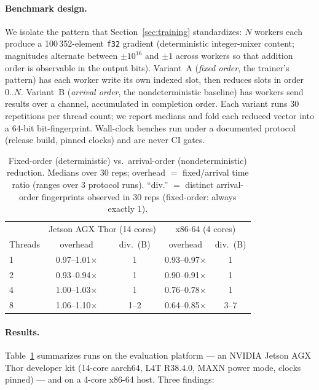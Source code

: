 \documentclass[sigconf,review]{acmart}
\begin{document}
\paragraph{Benchmark design.}
We isolate the pattern that Section~\ref{sec:training} standardizes: $N$
workers each produce a 100\,352-element \texttt{f32} gradient (deterministic
integer-mixer content; magnitudes alternate between $\pm 10^{16}$ and
$\pm 1$ across workers so that addition order is observable in the output
bits). Variant~A (\emph{fixed order}, the trainer's pattern) has each
worker write its own indexed slot, then reduces slots in order $0..N$.
Variant~B (\emph{arrival order}, the nondeterministic baseline) has workers
send results over a channel, accumulated in completion order. Each variant
runs 30 repetitions per thread count; we report medians and fold each
reduced vector into a 64-bit bit-fingerprint. Wall-clock benches run under
a documented protocol (release build, pinned clocks) and are never CI
gates.

\begin{table}
\caption{Fixed-order (deterministic) vs.\ arrival-order (nondeterministic)
reduction. Medians over 30 reps; overhead $=$ fixed/arrival time ratio
(ranges over 3 protocol runs). ``div.'' $=$ distinct arrival-order
fingerprints observed in 30 reps (fixed-order: always exactly 1).}
\label{tab:cost}
\small
\begin{tabular}{lcccc}
\toprule
& \multicolumn{2}{c}{Jetson AGX Thor (14 cores)} &
\multicolumn{2}{c}{x86-64 (4 cores)} \\
Threads & overhead & div.\ (B) & overhead & div.\ (B) \\
\midrule
1 & 0.97--1.01$\times$ & 1 & 0.93--0.97$\times$ & 1 \\
2 & 0.93--0.94$\times$ & 1 & 0.90--0.91$\times$ & 1 \\
4 & 1.00--1.03$\times$ & 1 & 0.76--0.78$\times$ & 1 \\
8 & 1.06--1.10$\times$ & 1--2 & 0.64--0.85$\times$ & 3--7 \\
\bottomrule
\end{tabular}
\end{table}

\paragraph{Results.}
Table~\ref{tab:cost} summarizes runs on the evaluation platform --- an
NVIDIA Jetson AGX Thor developer kit (14-core aarch64, L4T R38.4.0, MAXN
power mode, clocks pinned) --- and on a 4-core x86-64 host. Three findings:
\end{document}
